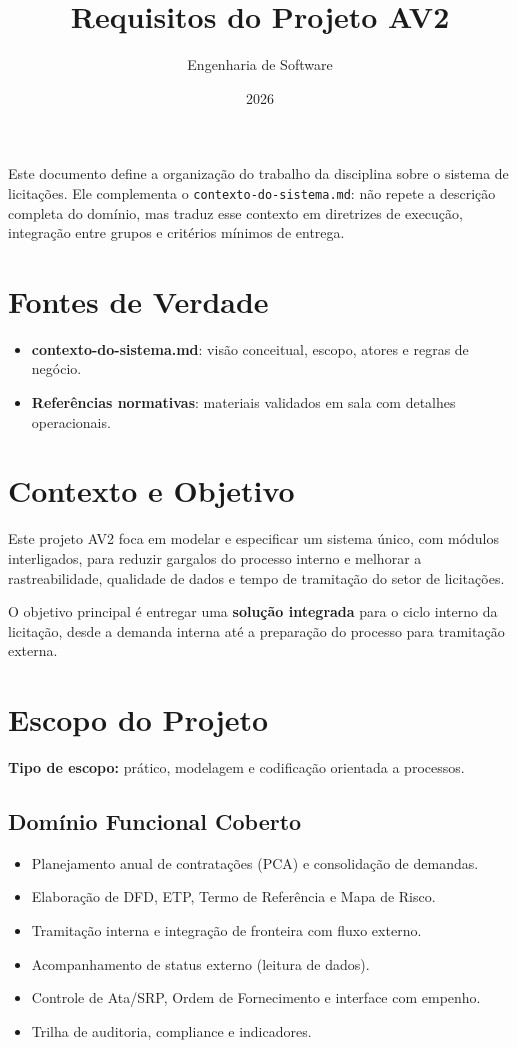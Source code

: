 \documentclass[a4paper,12pt]{article}
\title{\textbf{Requisitos do Projeto AV2}}
\author{Engenharia de Software}
\date{2026}
\begin{document}
\maketitle

Este documento define a organização do trabalho da disciplina sobre o sistema de licitações. Ele complementa o \texttt{contexto-do-sistema.md}: não repete a descrição completa do domínio, mas traduz esse contexto em diretrizes de execução, integração entre grupos e critérios mínimos de entrega.

\section*{Fontes de Verdade}
\begin{itemize}
    \item \textbf{contexto-do-sistema.md}: visão conceitual, escopo, atores e regras de negócio.
    \item \textbf{Referências normativas}: materiais validados em sala com detalhes operacionais.
\end{itemize}

\section{Contexto e Objetivo}
Este projeto AV2 foca em modelar e especificar um sistema único, com módulos interligados, para reduzir gargalos do processo interno e melhorar a rastreabilidade, qualidade de dados e tempo de tramitação do setor de licitações.

O objetivo principal é entregar uma \textbf{solução integrada} para o ciclo interno da licitação, desde a demanda interna até a preparação do processo para tramitação externa.

\section{Escopo do Projeto}
\textbf{Tipo de escopo:} prático, modelagem e codificação orientada a processos.

\subsection{Domínio Funcional Coberto}
\begin{itemize}
    \item Planejamento anual de contratações (PCA) e consolidação de demandas.
    \item Elaboração de DFD, ETP, Termo de Referência e Mapa de Risco.
    \item Tramitação interna e integração de fronteira com fluxo externo.
    \item Acompanhamento de status externo (leitura de dados).
    \item Controle de Ata/SRP, Ordem de Fornecimento e interface com empenho.
    \item Trilha de auditoria, compliance e indicadores.
\end{itemize}
\end{document}
